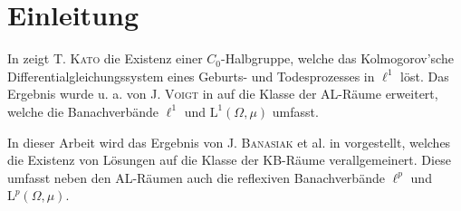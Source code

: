 \chapter{Einleitung}

\par
In \cite{kato_1954}
zeigt \textsc{T. Kato} die Existenz einer $C_0$-Halbgruppe, welche das Kolmogorov'sche Differentialgleichungssystem eines Geburts- und Todesprozesses in $\ell^1$ löst. Das Ergebnis wurde u. a. von \textsc{J. Voigt} in \cite{voigt_1989} %
auf die Klasse der AL-Räume erweitert, welche die Banachverbände  $\ell^1$ und $\text{L}^1(\Omega,\mu)$ umfasst.
\par
In dieser Arbeit wird das Ergebnis von \textsc{J. Banasiak} et al. in \cite{banasiak_lachowicz_2007}
vorgestellt, welches die Existenz von Lösungen auf die Klasse der KB-Räume verallgemeinert. Diese umfasst neben den AL-Räumen auch die reflexiven Banachverbände $\ell^p$ und $\text{L}^p(\Omega,\mu)$. 
\par





